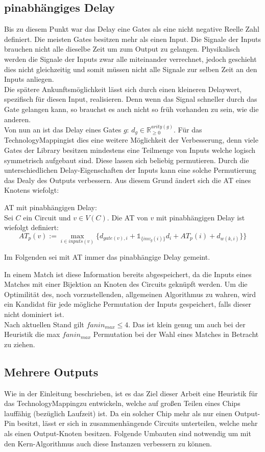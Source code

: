 \documentclass[11pt, a4paper, german]{article}
\newcommand{\TM}{TechnologyMapping}
\begin{document}
\subsection{pinabhängiges Delay}
\label{subsec:pinabh_delay}
Bis zu diesem Punkt war das Delay eine Gates als eine nicht negative Reelle Zahl definiert. Die meisten Gates besitzen mehr als einen Input. Die Signale der Inputs brauchen nicht alle dieselbe Zeit um zum Output zu gelangen. Physikalisch werden die Signale der Inputs zwar alle miteinander verrechnet, jedoch geschieht dies nicht gleichzeitig und somit müssen nicht alle Signale zur selben Zeit an den Inputs anliegen.\\
Die spätere Ankunftsmöglichkeit lässt sich durch einen kleineren Delaywert, spezifisch für diesen Input, realisieren. Denn wenn das Signal schneller durch das Gate gelangen kann, so brauchst es auch nicht so früh vorhanden zu sein, wie die anderen. \\
Von nun an ist das Delay eines Gates $g$: $d_g \in \mathbb{R}_{\geq 0}^{arity(g)}$. Für das \TM ist dies eine weitere Möglichkeit der Verbesserung, denn viele Gates der Library besitzen mindestens eine Teilmenge von Inputs welche logisch symmetrisch aufgebaut sind. Diese lassen sich beliebig permutieren. Durch die unterschiedlichen Delay-Eigenschaften der Inputs kann eine solche Permutierung das Dealy des Outputs verbessern. Aus diesem Grund ändert sich die AT eines Knotens wiefolgt: 
\begin{definition}{AT mit pinabhängigen Delay:}\\
	Sei $C$ ein Circuit und $v \in V(C)$. Die AT von $v$ mit pinabhängigen Delay ist wiefolgt definiert: \[ AT_p(v) :=  \max\limits_{i \in inputs(v)} \{   d_{gate(v),i} + \mathbb{1}_{\{inv_g(i) \}} d_{i} + AT_p(i) + d_{w(k,i)} \}   \}\]
\end{definition}
Im Folgenden sei mit AT immer das pinabhängige Delay gemeint.

In einem Match ist diese Information bereits abgespeichert, da die Inputs eines Matches mit einer Bijektion an Knoten des Circuits geknüpft werden. Um die Optimilität des, noch vorzustellenden, allgemeinen Algorithmus zu wahren, wird ein Kandidat für jede mögliche Permutation der Inputs gespeichert, falls dieser nicht dominiert ist.\\
Nach aktuellen Stand gilt $fanin_{max} \leq 4$. Das ist klein genug um auch bei der Heuristik die max $fanin_{max}$ Permutation bei der Wahl eines Matches in Betracht zu ziehen. 

\subsection{Mehrere Outputs}
\label{subsec:mehrere_outputs}
Wie in der Einleitung beschrieben, ist es das Ziel dieser Arbeit eine Heuristik für das \TM zu entwickeln, welche auf großen Teilen eines Chips lauffähig (bezüglich Laufzeit) ist. Da ein solcher Chip mehr als nur einen Output-Pin besitzt, lässt er sich in zusammenhängende Circuits unterteilen, welche mehr als einen Output-Knoten besitzen. Folgende Umbauten sind notwendig um mit den Kern-Algorithmus auch diese Instanzen verbessern zu können.\\
\end{document}
